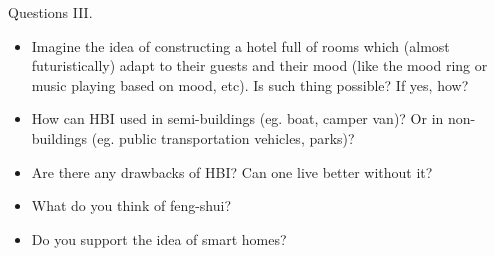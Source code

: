 \documentclass[10pt]{beamer}
\begin{document}
\begin{frame}{Questions III.}
	\begin{itemize}
        \pause{}
		\item Imagine the idea of constructing a hotel full of rooms which (almost futuristically) adapt to their guests and their mood (like the mood ring or music playing based on mood, etc). Is such thing possible? If yes, how?
		\pause{}
		\item How can HBI used in semi-buildings (eg. boat, camper van)? Or in non-buildings (eg. public transportation vehicles, parks)?
		\pause{}
		\item Are there any drawbacks of HBI? Can one live better without it?
		\pause{}
		\item What do you think of feng-shui?
		\pause{}
		\item Do you support the idea of smart homes?
	\end{itemize}	
\end{frame}

  

\end{document}
